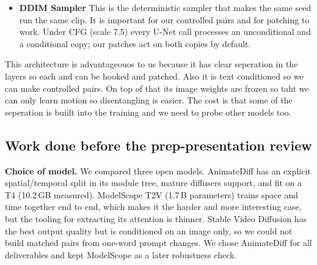 \documentclass[twoside,english]{article}
\begin{document}
\begin{itemize}
frames form a sequence. It also adds a sinusoidal position embedding and applies two temporal 
self attention layers and FFN layer and finally adds the result back to the input through a zero initialised output layer.
Temporal attention is where the information crosses through the frames hence the only place where motionca
can be computed. Without positional encoding forward and backward motion would seem the same .
residual addition means that the content and motion mix together and that is why we cannot copy
the whole output fo layer. The zero initialisation means training starts from the 
frozen image model and the motion module learns to add motion on top of it. The attention 
probabilites are frame to frame matrices what is used for our attention injection baseline.
\item\textbf{DDIM Sampler} This is the deterministic sampler that makes the same seed run the same 
clip. It is important for our controlled pairs and for patching to work. Under CFG (scale 7.5) every U-Net call processes an unconditional and a conditional copy; our patches act on both copies by default.
\end{itemize}

This architecture is advantageouos to us because it has clear seperation in the layers so each and can 
be hooked and patched. Also it is text conditioned so we can make controlled pairs. On top of that
its image weights are frozen so taht we can only learn motion so disentangling is easier. 
The cost is that some of the seperation is buiilt into the training and we need to probe other models too. 


\subsection{Work done before the prep-presentation review} \label{sec:before}

\textbf{Choice of model.} We compared three open models. AnimateDiff has an explicit
spatial/temporal split in its module tree, mature diffusers support, and fit on a T4 (10.2\,GB
measured). ModelScope T2V (1.7\,B parameters) trains space and time together end to end, which
makes it the harder and more interesting case, but the tooling for extracting its attention is
thinner. Stable Video Diffusion has the best output quality but is conditioned on an image only,
so we could not build matched pairs from one-word prompt changes. We chose AnimateDiff for all
deliverables and kept ModelScope as a later robustness check.
\end{document}
